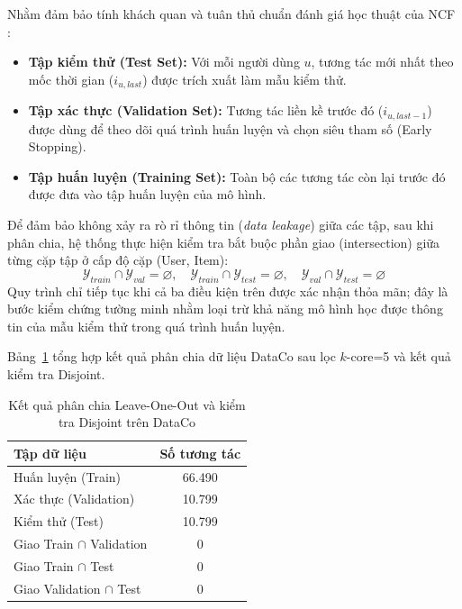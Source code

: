 Nhằm đảm bảo tính khách quan và tuân thủ chuẩn đánh giá học thuật của NCF \parencite{he2017ncf}:
\begin{itemize}
    \item \textbf{Tập kiểm thử (Test Set):} Với mỗi người dùng $u$, tương tác mới nhất theo mốc thời gian ($i_{u, last}$) được trích xuất làm mẫu kiểm thử.
    \item \textbf{Tập xác thực (Validation Set):} Tương tác liền kề trước đó ($i_{u, last-1}$) được dùng để theo dõi quá trình huấn luyện và chọn siêu tham số (Early Stopping).
    \item \textbf{Tập huấn luyện (Training Set):} Toàn bộ các tương tác còn lại trước đó được đưa vào tập huấn luyện của mô hình.
\end{itemize}

Để đảm bảo không xảy ra rò rỉ thông tin (\textit{data leakage}) giữa các tập, sau khi phân chia, hệ thống thực hiện kiểm tra bắt buộc phần giao (intersection) giữa từng cặp tập ở cấp độ cặp (User, Item):
\begin{equation}
    \mathcal{Y}_{train} \cap \mathcal{Y}_{val} = \varnothing, \quad
    \mathcal{Y}_{train} \cap \mathcal{Y}_{test} = \varnothing, \quad
    \mathcal{Y}_{val} \cap \mathcal{Y}_{test} = \varnothing
    \label{eq:disjoint_assert}
\end{equation}
Quy trình chỉ tiếp tục khi cả ba điều kiện trên được xác nhận thỏa mãn; đây là bước kiểm chứng tường minh nhằm loại trừ khả năng mô hình học được thông tin của mẫu kiểm thử trong quá trình huấn luyện.

Bảng~\ref{tab:split_dataco} tổng hợp kết quả phân chia dữ liệu DataCo sau lọc $k$-core=5 và kết quả kiểm tra Disjoint.

\begin{table}[htbp]
    \centering
    \caption{Kết quả phân chia Leave-One-Out và kiểm tra Disjoint trên DataCo}
    \label{tab:split_dataco}
    \begin{tabular}{|l|c|}
        \hline
        \textbf{Tập dữ liệu} & \textbf{Số tương tác} \\
        \hline
        Huấn luyện (Train) & 66.490 \\
        \hline
        Xác thực (Validation) & 10.799 \\
        \hline
        Kiểm thử (Test) & 10.799 \\
        \hline
        Giao Train $\cap$ Validation & 0 \\
        \hline
        Giao Train $\cap$ Test & 0 \\
        \hline
        Giao Validation $\cap$ Test & 0 \\
        \hline
    \end{tabular}
\end{table}

